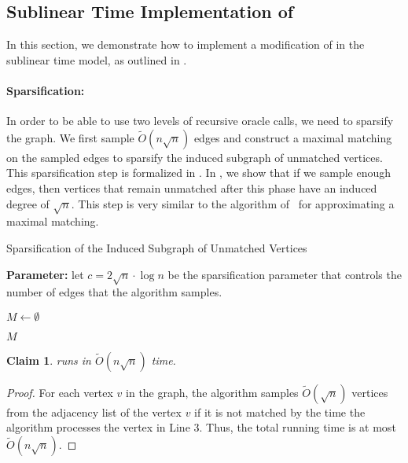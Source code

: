 \documentclass[letterpaper,11pt]{article}
\newtheorem{claim}[lemma]{Claim}
\begin{document}
\subsection{Sublinear Time Implementation of }

In this section, we demonstrate how to implement a modification of  in the sublinear time model,  as outlined in .




\paragraph{Sparsification:} In order to be able to use two levels of recursive oracle calls, we need to sparsify the graph. We first sample $\widetilde{O}(n \sqrt{n})$ edges and construct a maximal matching on the sampled edges to sparsify the induced subgraph of unmatched vertices. This sparsification step is formalized in . In , we show that if we sample enough edges, then vertices that remain unmatched after this phase have an induced degree of $\sqrt{n}$. This step is very similar to the algorithm of~\cite[Appendix A]{chen2020sublinear} for approximating a maximal matching.






\begin{algorithm}
\caption{Sparsification of the Induced Subgraph of Unmatched Vertices}
\label{alg:sparsification}
\textbf{Parameter:} let $c = 2 \sqrt{n} \cdot \log n$ be the sparsification parameter that controls the number of edges that the algorithm samples.

$M \gets \emptyset$


\Return $M$


\end{algorithm}


\begin{claim}\label{clm:sparsification-time}
     runs in $\widetilde{O}(n \sqrt{n})$ time.
\end{claim}
\begin{proof}
    For each vertex $v$ in the graph, the algorithm samples $\widetilde{O}(\sqrt{n})$ vertices from the adjacency list of the vertex $v$ if it is not matched by the time the algorithm processes the vertex in Line 3. Thus, the total running time is at most $\widetilde{O}(n\sqrt{n})$.
\end{proof}
\end{document}
